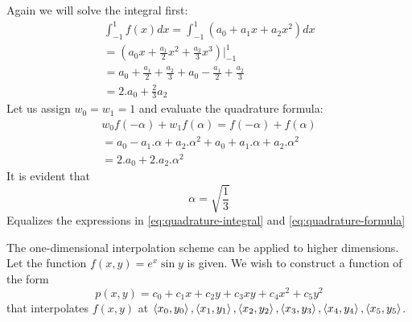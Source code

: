 \documentclass[a4paper, oneside]{article}
\begin{document}
\begin{solution}
    Again we will solve the integral first:
    \begin{align}
        \int_{-1}^1 f(x) dx = \int_{-1}^1 (a_0 + a_1 x + a_2x^2) dx                 \\
        = (a_0 x + \frac{a_1}{2} x^2 + \frac{a_2}{3}x^3)\bigg\rvert_{-1}^1          \\
        = a_0 + \frac{a_1}{2} + \frac{a_2}{3} + a_0 - \frac{a_1}{2} + \frac{a_2}{3} \\
        = 2.a_0 + \frac{2}{3}a_2 \label{eq:quadrature-integral}
    \end{align}
    Let us assign $w_0 = w_1 = 1$ and evaluate the quadrature formula:
    \begin{align}
        w_0 f(-\alpha) + w_1 f(\alpha) = f(-\alpha) + f(\alpha)             \\
        = a_0 - a_1.\alpha + a_2.\alpha^2 + a_0 + a_1.\alpha + a_2.\alpha^2 \\
        = 2.a_0 + 2.a_2.\alpha^2 \label{eq:quadrature-formula}
    \end{align}
    It is evident that
    \begin{equation}
        \alpha = \sqrt{\frac{1}{3}}
    \end{equation}
    Equalizes the expressions in \eqref{eq:quadrature-integral} and \eqref{eq:quadrature-formula}
\end{solution}
\begin{problem}
The one-dimensional interpolation scheme can be applied to higher dimensions. Let the function $f(x, y) = e^x \sin y$ is given. We wish to construct a function of the form
\begin{equation}
    p(x, y) = c_0 + c_1x + c_2y + c_3xy + c_4x^2 + c_5y^2
\end{equation}
that interpolates $f(x, y)$ at $\left\langle x_0, y_0\right\rangle, \left\langle x_1, y_1\right\rangle, \left\langle x_2, y_2\right\rangle, \left\langle x_3, y_3\right\rangle, \left\langle x_4, y_4\right\rangle, \left\langle x_5, y_5\right\rangle$.
\end{problem}
\end{document}
